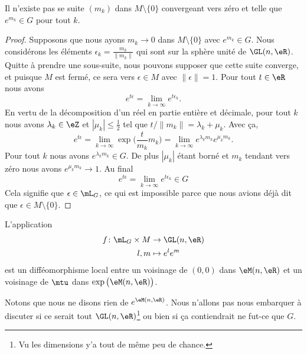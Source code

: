 \begin{lemma}   \label{LemHOsbREC}
	Il n'existe pas se suite \( (m_k)\) dans \( M\setminus\{ 0 \}\) convergeant vers zéro et telle que \(  e^{m_k}\in G\) pour tout \( k\).
\end{lemma}

\begin{proof}
	Supposons que nous ayons \( m_k\to 0\) dans \( M\setminus\{ 0 \}\) avec \(  e^{m_k}\in G\). Nous considérons les éléments \( \epsilon_k=\frac{ m_k }{ \| m_k \| }\) qui sont sur la sphère unité de \(\GL(n,\eR)\). Quitte à prendre une sous-suite, nous pouvons supposer que cette suite converge, et puisque \( M\) est fermé, ce sera vers \( \epsilon\in M\) avec \( \| \epsilon \|=1\). Pour tout \( t\in \eR\) nous avons
	\begin{equation}
		e^{t\epsilon}=\lim_{k\to \infty}  e^{t\epsilon_k}.
	\end{equation}
	En vertu de la décomposition d'un réel en partie entière et décimale, pour tout \( k\) nous avons \( \lambda_k\in \eZ\) et \( | \mu_k |\leq \frac{ 1 }{2}\) tel que \( t/\| m_k \|=\lambda_k+\mu_k\). Avec ça,
	\begin{equation}
		e^{t\epsilon}=\lim_{k\to \infty}\exp\Big( \frac{ t }{ m_k }m_k \Big)=\lim_{k\to \infty}  e^{\lambda_km_k} e^{\mu_km_k}.
	\end{equation}
	Pour tout \( k\) nous avons \(  e^{\lambda_km_k}\in G\). De plus \( | \mu_k |\) étant borné et \( m_k\) tendant vers zéro nous avons \(  e^{\mu_km_k}\to 1\). Au final
	\begin{equation}
		e^{t\epsilon}=\lim_{k\to \infty}  e^{t\epsilon_k}\in G
	\end{equation}
	Cela signifie que \( \epsilon\in\mL_G\), ce qui est impossible parce que nous avions déjà dit que \( \epsilon\in M\setminus\{ 0 \}\).
\end{proof}

\begin{lemma}   \label{LemGGTtxdF}
	L'application
	\begin{equation}
		\begin{aligned}
			f\colon \mL_G\times M & \to \GL(n,\eR)       \\
			l,m                   & \mapsto  e^{l} e^{m}
		\end{aligned}
	\end{equation}
	est un difféomorphisme local entre un voisinage de \( (0,0)\) dans \( \eM(n,\eR)\) et un voisinage de \( \mtu\) dans \( \exp\big( \eM(n,\eR) \big)\).
\end{lemma}
Notons que nous ne disons rien de \(  e^{\eM(n,\eR)}\). Nous n'allons pas nous embarquer à discuter si ce serait tout \( \GL(n,\eR)\)\footnote{Vu les dimensions y'a tout de même peu de chance.} ou bien si ça contiendrait ne fut-ce que \( G\).

